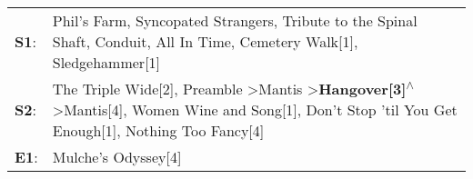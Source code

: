 \begin{supertabular}{p{0.03\textwidth}p{0.92\textwidth}}
 \textbf{S1}:  &                                                                                                        Phil's Farm\textsuperscript{}, \enspace Syncopated Strangers\textsuperscript{}, \enspace Tribute to the Spinal Shaft\textsuperscript{}, \enspace Conduit\textsuperscript{}, \enspace All In Time\textsuperscript{}, \enspace Cemetery Walk[1]\textsuperscript{}, \enspace Sledgehammer[1]\textsuperscript{}  \enspace  \\
 \textbf{S2}:  &  The Triple Wide[2]\textsuperscript{}, \enspace Preamble\textsuperscript{} \textgreater \enspace Mantis\textsuperscript{} \textgreater \enspace \textbf{Hangover[3]\textsuperscript{$\wedge$}} \textgreater \enspace Mantis[4]\textsuperscript{}, \enspace Women Wine and Song[1]\textsuperscript{}, \enspace Don't Stop 'til You Get Enough[1]\textsuperscript{}, \enspace Nothing Too Fancy[4]\textsuperscript{}  \enspace  \\
 \textbf{E1}:  &                                                                                                                                                                                                                                                                                                                                                                              Mulche's Odyssey[4]\textsuperscript{}  \enspace  \\
\end{supertabular}
